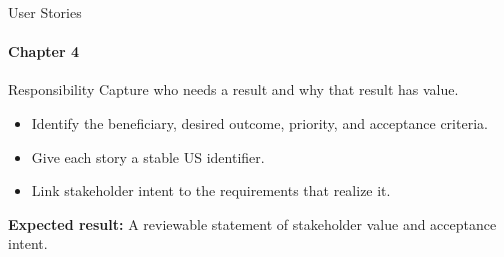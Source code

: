 \begin{frame}{User Stories}
\framesubtitle{Chapter 4}
\begin{block}{Responsibility}
Capture who needs a result and why that result has value.
\end{block}
\begin{itemize}
  \item Identify the beneficiary, desired outcome, priority, and acceptance criteria.
  \item Give each story a stable US identifier.
  \item Link stakeholder intent to the requirements that realize it.
\end{itemize}
\vspace{0.15cm}
\textbf{Expected result:} A reviewable statement of stakeholder value and acceptance intent.
\end{frame}

